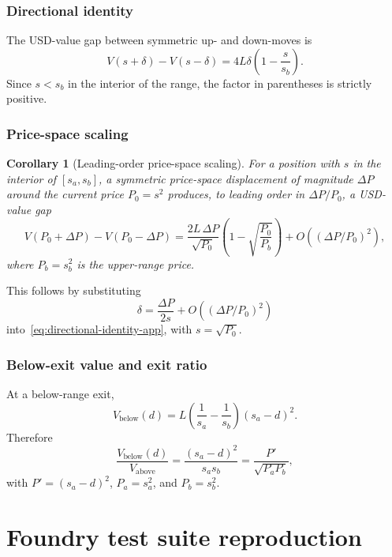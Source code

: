 \documentclass[11pt,a4paper]{article}
\theoremstyle{plain}
\newtheorem{corollary}{Corollary}[theorem]
\begin{document}
\subsubsection*{Directional identity}

The USD-value gap between symmetric up- and down-moves is
\begin{equation}\label{eq:directional-identity-app}
V(s + \delta) - V(s - \delta)
= 4L\delta\left(1 - \frac{s}{s_b}\right).
\end{equation}
Since $s < s_b$ in the interior of the range, the factor in parentheses is strictly positive.

\subsubsection*{Price-space scaling}

\begin{corollary}[Leading-order price-space scaling]\label{cor:directional-scaling}
For a position with $s$ in the interior of $[s_a, s_b]$, a symmetric price-space displacement of magnitude $\Delta P$ around the current price $P_0 = s^2$ produces, to leading order in $\Delta P/P_0$, a USD-value gap
\[
V(P_0 + \Delta P) - V(P_0 - \Delta P)
=
\frac{2L\,\Delta P}{\sqrt{P_0}}
\left(1 - \sqrt{\frac{P_0}{P_b}}\right)
+
O\!\left((\Delta P/P_0)^2\right),
\]
where $P_b = s_b^2$ is the upper-range price.
\end{corollary}

This follows by substituting
\[
\delta = \frac{\Delta P}{2s} + O\!\left((\Delta P/P_0)^2\right)
\]
into~\eqref{eq:directional-identity-app}, with $s = \sqrt{P_0}$.

\subsubsection*{Below-exit value and exit ratio}

At a below-range exit,
\begin{equation}\label{eq:vbelow-app}
V_{\text{below}}(d) = L\left(\frac{1}{s_a} - \frac{1}{s_b}\right)(s_a - d)^2.
\end{equation}
Therefore
\[
\frac{V_{\text{below}}(d)}{V_{\text{above}}}
=
\frac{(s_a - d)^2}{s_a s_b}
=
\frac{P'}{\sqrt{P_a P_b}},
\]
with $P' = (s_a-d)^2$, $P_a = s_a^2$, and $P_b = s_b^2$.

\section{Foundry test suite reproduction}\label{app:foundry}
\end{document}
